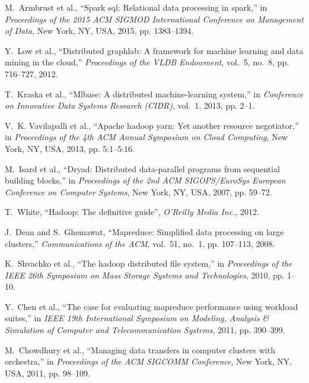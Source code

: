 \documentclass[10pt,journal,compsoc]{IEEEtran}
\begin{document}
\begin{thebibliography}{44}
M.~Armbrust et al., ``Spark sql: Relational
  data processing in spark,'' in \emph{Proceedings of the 2015 ACM SIGMOD
  International Conference on Management of Data}, New York, NY, USA, 2015, pp. 1383--1394.

Y.~Low et al.,
  ``Distributed graphlab: A framework for machine learning and data mining in
  the cloud,'' \emph{Proceedings of the VLDB Endowment}, vol.~5, no.~8, pp.
  716--727, 2012.

T.~Kraska et al., ``Mlbase: A distributed machine-learning system,'' in
  \emph{Conference on Innovative Data Systems Research (CIDR)}, vol.~1, 2013,
  pp. 2--1.

V.~K. Vavilapalli et al., ``Apache hadoop yarn: Yet another
  resource negotiator,'' in \emph{Proceedings of the 4th ACM Annual Symposium
  on Cloud Computing}, New York, NY, USA, 2013, pp. 5:1--5:16.


M.~Isard et al., ``Dryad: Distributed
  data-parallel programs from sequential building blocks,'' in
  \emph{Proceedings of the 2nd ACM SIGOPS/EuroSys European Conference on
  Computer Systems}, New York, NY, USA, 2007, pp. 59--72.

T.~White, ``Hadoop: The definitive guide'', \emph{O'Reilly Media Inc.}, 2012.

J.~Dean and S.~Ghemawat, ``Mapreduce: Simplified data processing on large
  clusters,'' \emph{Communications of the ACM}, vol.~51, no.~1, pp. 107--113,
  2008.

K.~Shvachko et al., ``The hadoop distributed file
  system,'' in \emph{Proceedings of the IEEE 26th Symposium on Mass Storage
  Systems and Technologies}, 2010,
  pp. 1--10.

Y.~Chen et al., ``The case for evaluating
  mapreduce performance using workload suites,'' in \emph{IEEE 19th
  International Symposium on Modeling, Analysis \& Simulation of Computer and
  Telecommunication Systems}, 2011, pp. 390--399.

M.~Chowdhury et al., ``Managing data
  transfers in computer clusters with orchestra,'' in \emph{Proceedings of the
  ACM SIGCOMM Conference}, New York, NY,
  USA, 2011, pp. 98--109.


\end{thebibliography}
\end{document}
